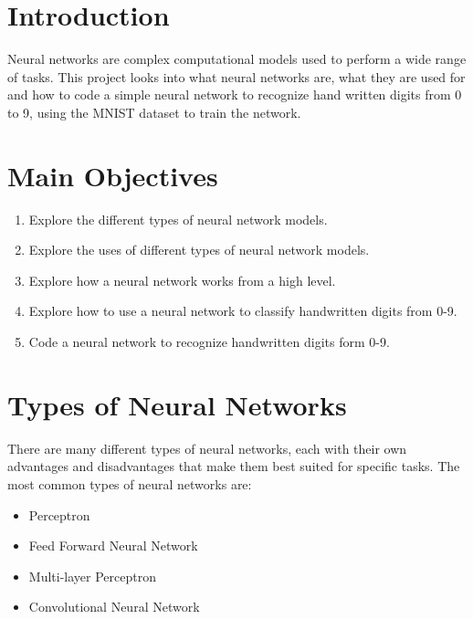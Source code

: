 \documentclass[a1,portrait]{a1poster}
\begin{document}
\begin{multicols}{2}
\section*{Introduction}
Neural networks are complex computational models used to perform a wide range of tasks. This project looks into what neural networks are, what they are used for and how to code a simple neural network to recognize hand written digits from 0 to 9, using the MNIST dataset to train the network.


\color{Black} %

\section*{Main Objectives}

\begin{enumerate}
\item Explore the different types of neural network models.
\item Explore the uses of different types of neural network models.
\item Explore how a neural network works from a high level.
\item Explore how to use a neural network to classify handwritten digits from 0-9.
\item Code a neural network to recognize handwritten digits form 0-9.
\end{enumerate}



\section*{Types of Neural Networks}
There are many different types of neural networks, each with their own advantages and disadvantages that make them best suited for specific tasks. The most common types of neural networks are:
\begin{itemize}
    \item Perceptron
    \item Feed Forward Neural Network
    \item Multi-layer Perceptron
    \item Convolutional Neural Network
\end{itemize}


\end{multicols}
\end{document}

